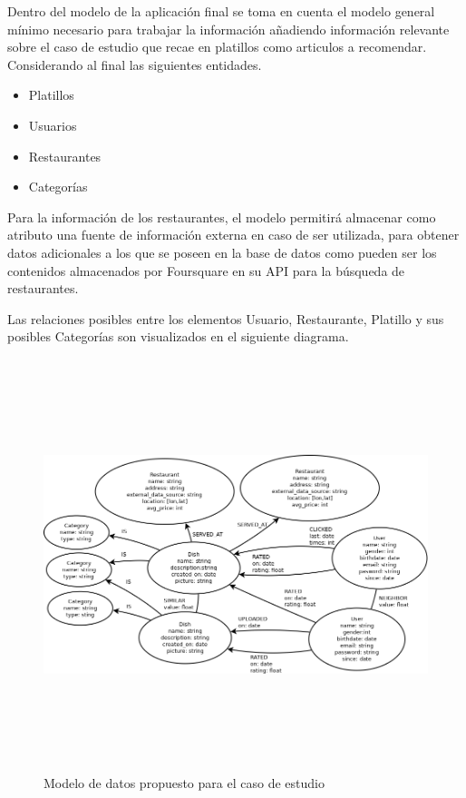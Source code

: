       Dentro del modelo de la aplicación final se toma en cuenta el modelo general mínimo necesario para trabajar la información añadiendo información relevante sobre el caso de estudio que recae en platillos como articulos a recomendar. Considerando al final las siguientes entidades.
      \begin{itemize}
        \item Platillos
        \item Usuarios
        \item Restaurantes
        \item Categorías
      \end{itemize}

      Para la información de los restaurantes, el modelo  permitirá almacenar como atributo una fuente de información externa en caso de ser utilizada, para obtener datos adicionales a los que se poseen en la base de datos como pueden ser los contenidos almacenados por Foursquare en su API para la búsqueda de restaurantes.

      Las relaciones posibles entre los elementos Usuario, Restaurante, Platillo y sus posibles Categorías son visualizados en el siguiente diagrama.

      \newpage
      \begin{landscape}
        \begin{figure}[h!]
          \centering
          \includegraphics[width=22.5cm,height=12cm]{./images/sc_data_model.png}
          \caption{Modelo de datos propuesto para el caso de estudio}
        \end{figure}
      \end{landscape}
      \newpage


